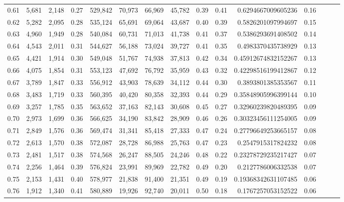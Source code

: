 \begin{tabular}{rrrrrrrrrrrrrrr}
0.61 &   5,681 &  2,148 &  0.27 &  529,842 &   70,973 &   66,969 &   45,782 &  0.39 &  0.41 &    0.6294667009605236 &      0.16 \\
0.62 &   5,282 &  2,095 &  0.28 &  535,124 &   65,691 &   69,064 &   43,687 &  0.40 &  0.39 &    0.5826201097994697 &      0.15 \\
0.63 &   4,960 &  1,949 &  0.28 &  540,084 &   60,731 &   71,013 &   41,738 &  0.41 &  0.37 &    0.5386293691408502 &      0.14 \\
0.64 &   4,543 &  2,011 &  0.31 &  544,627 &   56,188 &   73,024 &   39,727 &  0.41 &  0.35 &    0.4983370435738929 &      0.13 \\
0.65 &   4,421 &  1,914 &  0.30 &  549,048 &   51,767 &   74,938 &   37,813 &  0.42 &  0.34 &   0.45912674832152267 &      0.13 \\
0.66 &   4,075 &  1,854 &  0.31 &  553,123 &   47,692 &   76,792 &   35,959 &  0.43 &  0.32 &   0.42298516199412867 &      0.12 \\
0.67 &   3,789 &  1,847 &  0.33 &  556,912 &   43,903 &   78,639 &   34,112 &  0.44 &  0.30 &    0.3893801385353567 &      0.11 \\
0.68 &   3,483 &  1,719 &  0.33 &  560,395 &   40,420 &   80,358 &   32,393 &  0.44 &  0.29 &   0.35848905996399144 &      0.10 \\
0.69 &   3,257 &  1,785 &  0.35 &  563,652 &   37,163 &   82,143 &   30,608 &  0.45 &  0.27 &   0.32960239820489395 &      0.09 \\
0.70 &   2,973 &  1,699 &  0.36 &  566,625 &   34,190 &   83,842 &   28,909 &  0.46 &  0.26 &   0.30323456111254005 &      0.09 \\
0.71 &   2,849 &  1,576 &  0.36 &  569,474 &   31,341 &   85,418 &   27,333 &  0.47 &  0.24 &   0.27796649253665157 &      0.08 \\
0.72 &   2,613 &  1,570 &  0.38 &  572,087 &   28,728 &   86,988 &   25,763 &  0.47 &  0.23 &    0.2547915317824232 &      0.08 \\
0.73 &   2,481 &  1,517 &  0.38 &  574,568 &   26,247 &   88,505 &   24,246 &  0.48 &  0.22 &   0.23278729235217427 &      0.07 \\
0.74 &   2,256 &  1,464 &  0.39 &  576,824 &   23,991 &   89,969 &   22,782 &  0.49 &  0.20 &    0.2127786006332538 &      0.07 \\
0.75 &   2,153 &  1,431 &  0.40 &  578,977 &   21,838 &   91,400 &   21,351 &  0.49 &  0.19 &   0.19368342631107485 &      0.06 \\
0.76 &   1,912 &  1,340 &  0.41 &  580,889 &   19,926 &   92,740 &   20,011 &  0.50 &  0.18 &    0.1767257053152522 &      0.06 \\

\end{tabular}
